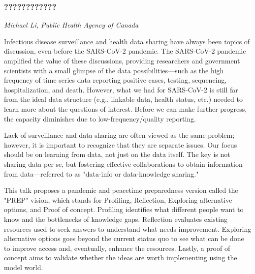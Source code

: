 \subsubsection*{????????????}
\textit{Michael Li, Public Health Agency of Canada}

Infectious disease surveillance and health data sharing have always
been topics of discussion, even before the SARS-CoV-2 pandemic. The
SARS-CoV-2 pandemic amplified the value of these discussions,
providing researchers and government scientists with a small glimpse
of the data possibilities—such as the high frequency of time series
data reporting positive cases, testing, sequencing, hospitalization,
and death. However, what we had for SARS-CoV-2 is still far from the
ideal data structure (e.g., linkable data, health status, etc.) needed
to learn more about the questions of interest. Before we can make
further progress, the capacity diminishes due to low-frequency/quality
reporting.

Lack of surveillance and data sharing are often viewed as the same
problem; however, it is important to recognize that they are separate
issues.  Our focus should be on learning from data, not just on the
data itself. The key is not sharing data per se, but fostering
effective collaborations to obtain information from data—referred to
as "data-info or data-knowledge sharing."

This talk proposes a pandemic and peacetime preparedness version
called the "PREP" vision, which stands for Profiling, Reflection,
Exploring alternative options, and Proof of concept. Profiling
identifies what different people want to know and the bottlenecks of
knowledge gaps.  Reflection evaluates existing resources used to seek
answers to understand what needs improvement. Exploring alternative
options goes beyond the current status quo to see what can be done to
improve access and, eventually, enhance the resources. Lastly, a proof
of concept aims to validate whether the ideas are worth implementing
using the model world.
